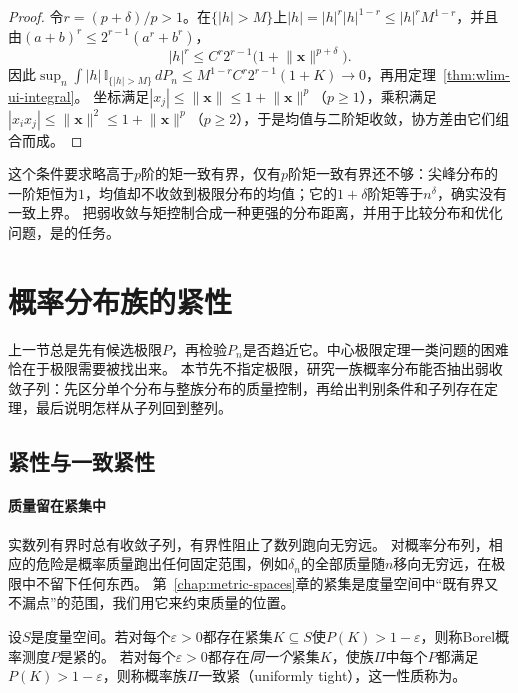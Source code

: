 \begin{proof}
令$r=(p+\delta)/p>1$。在$\{|h|>M\}$上$|h|=|h|^r|h|^{1-r}\leq|h|^rM^{1-r}$，并且由$(a+b)^r\leq2^{r-1}(a^r+b^r)$，
\[
  |h|^r\leq C^r2^{r-1}\bigl(1+\lVert\bm x\rVert^{p+\delta}\bigr).
\]
因此$\sup_n\int|h|\,\mathbb I_{\{|h|>M\}}\,dP_n\leq M^{1-r}C^r2^{r-1}(1+K)\to0$，再用定理~\ref{thm:wlim-ui-integral}。
坐标满足$|x_j|\leq\lVert\bm x\rVert\leq1+\lVert\bm x\rVert^p$（$p\geq1$），乘积满足$|x_ix_j|\leq\lVert\bm x\rVert^2\leq1+\lVert\bm x\rVert^p$（$p\geq2$），于是均值与二阶矩收敛，协方差由它们组合而成。
\end{proof}

这个条件要求略高于$p$阶的矩一致有界，仅有$p$阶矩一致有界还不够：尖峰分布的一阶矩恒为$1$，均值却不收敛到极限分布的均值；它的$1+\delta$阶矩等于$n^\delta$，确实没有一致上界。
把弱收敛与矩控制合成一种更强的分布距离，并用于比较分布和优化问题，是的任务。

\section{概率分布族的紧性}
\label{sec:wlim-tightness}

上一节总是先有候选极限$P$，再检验$P_n$是否趋近它。中心极限定理一类问题的困难恰在于极限需要被找出来。
本节先不指定极限，研究一族概率分布能否抽出弱收敛子列：先区分单个分布与整族分布的质量控制，再给出判别条件和子列存在定理，最后说明怎样从子列回到整列。

\subsection{紧性与一致紧性}

\paragraph{质量留在紧集中}
实数列有界时总有收敛子列，有界性阻止了数列跑向无穷远。
对概率分布列，相应的危险是概率质量跑出任何固定范围，例如$\delta_n$的全部质量随$n$移向无穷远，在极限中不留下任何东西。
第~\ref{chap:metric-spaces}章的紧集是度量空间中“既有界又不漏点”的范围，我们用它来约束质量的位置。

\begin{definition}[紧性与一致紧性]
\label{def:wlim-tight}
设$S$是度量空间。若对每个$\varepsilon>0$都存在紧集$K\subseteq S$使$P(K)>1-\varepsilon$，则称Borel概率测度$P$是紧的。
若对每个$\varepsilon>0$都存在\emph{同一个}紧集$K$，使族$\Pi$中每个$P$都满足$P(K)>1-\varepsilon$，则称概率族$\Pi$一致紧（uniformly tight），这一性质称为。
\end{definition}

